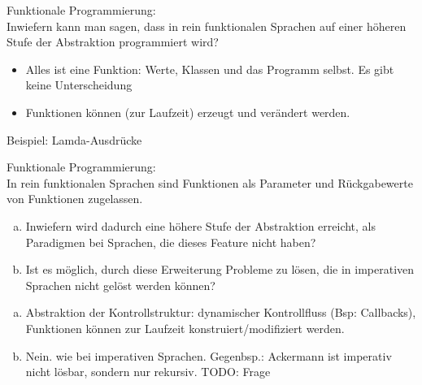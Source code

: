 \begin{card}
	Funktionale Programmierung:\\
	Inwiefern kann man sagen, dass in rein funktionalen Sprachen auf einer höheren Stufe der Abstraktion programmiert wird?
	\hr
	\begin{itemize}
	\item Alles ist eine Funktion: Werte, Klassen und das Programm selbst. Es gibt keine Unterscheidung
	\item Funktionen können (zur Laufzeit) erzeugt und verändert werden.
	
	\end{itemize}
	Beispiel: Lamda-Ausdrücke
\end{card}

\begin{card}
	Funktionale Programmierung:\\
	In rein funktionalen Sprachen sind Funktionen als Parameter und Rückgabewerte von Funktionen zugelassen. 
	\begin{enumerate}[a)]
	\item  Inwiefern wird dadurch eine höhere Stufe der Abstraktion erreicht, als Paradigmen bei Sprachen, die dieses Feature nicht haben?
	\item Ist es möglich, durch diese Erweiterung Probleme zu lösen, die in imperativen Sprachen nicht gelöst werden können?
	\end{enumerate}
	\hr
	\begin{enumerate}[a)]
	\item Abstraktion der Kontrollstruktur: dynamischer Kontrollfluss (Bsp: Callbacks), Funktionen können zur Laufzeit konstruiert/modifiziert werden.
	\item  Nein. wie bei imperativen Sprachen. Gegenbsp.: Ackermann ist imperativ nicht lösbar, sondern nur rekursiv. TODO: Frage
	\end{enumerate}
\end{card}